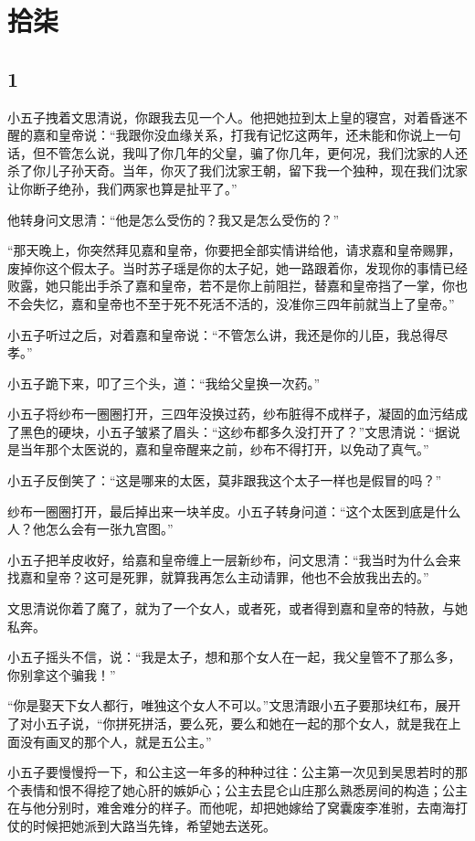 \section{拾柒}

{\centering\subsection{1}}

小五子拽着文思清说，你跟我去见一个人。他把她拉到太上皇的寝宫，对着昏迷不醒的嘉和皇帝说：“我跟你没血缘关系，打我有记忆这两年，还未能和你说上一句话，但不管怎么说，我叫了你几年的父皇，骗了你几年，更何况，我们沈家的人还杀了你儿子孙天奇。当年，你灭了我们沈家王朝，留下我一个独种，现在我们沈家让你断子绝孙，我们两家也算是扯平了。”

他转身问文思清：“他是怎么受伤的？我又是怎么受伤的？”

“那天晚上，你突然拜见嘉和皇帝，你要把全部实情讲给他，请求嘉和皇帝赐罪，废掉你这个假太子。当时苏子瑶是你的太子妃，她一路跟着你，发现你的事情已经败露，她只能出手杀了嘉和皇帝，若不是你上前阻拦，替嘉和皇帝挡了一掌，你也不会失忆，嘉和皇帝也不至于死不死活不活的，没准你三四年前就当上了皇帝。”

小五子听过之后，对着嘉和皇帝说：“不管怎么讲，我还是你的儿臣，我总得尽孝。”

小五子跪下来，叩了三个头，道：“我给父皇换一次药。”

小五子将纱布一圈圈打开，三四年没换过药，纱布脏得不成样子，凝固的血污结成了黑色的硬块，小五子皱紧了眉头：“这纱布都多久没打开了？”文思清说：“据说是当年那个太医说的，嘉和皇帝醒来之前，纱布不得打开，以免动了真气。”

小五子反倒笑了：“这是哪来的太医，莫非跟我这个太子一样也是假冒的吗？”

纱布一圈圈打开，最后掉出来一块羊皮。小五子转身问道：“这个太医到底是什么人？他怎么会有一张九宫图。”

小五子把羊皮收好，给嘉和皇帝缠上一层新纱布，问文思清：“我当时为什么会来找嘉和皇帝？这可是死罪，就算我再怎么主动请罪，他也不会放我出去的。”

文思清说你着了魔了，就为了一个女人，或者死，或者得到嘉和皇帝的特赦，与她私奔。

小五子摇头不信，说：“我是太子，想和那个女人在一起，我父皇管不了那么多，你别拿这个骗我！”

“你是娶天下女人都行，唯独这个女人不可以。”文思清跟小五子要那块红布，展开了对小五子说，“你拼死拼活，要么死，要么和她在一起的那个女人，就是我在上面没有画叉的那个人，就是五公主。”

小五子要慢慢捋一下，和公主这一年多的种种过往：公主第一次见到吴思若时的那个表情和恨不得挖了她心肝的嫉妒心；公主去昆仑山庄那么熟悉房间的构造；公主在与他分别时，难舍难分的样子。而他呢，却把她嫁给了窝囊废李准驸，去南海打仗的时候把她派到大路当先锋，希望她去送死。


